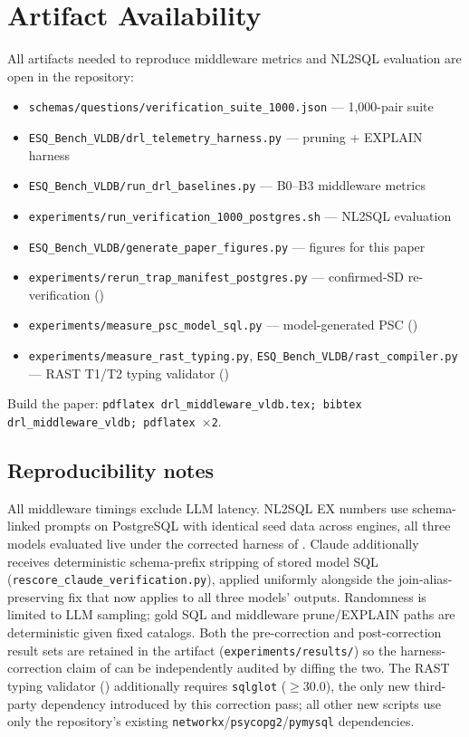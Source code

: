 \documentclass[twocolumn]{svjour3}
\begin{document}
\section{Artifact Availability}
\label{sec:artifact}

All artifacts needed to reproduce middleware metrics and NL2SQL evaluation are open in the repository:
\begin{itemize}[leftmargin=*]
  \item \texttt{schemas/questions/verification\_suite\_1000.json} --- 1{,}000-pair suite
  \item \texttt{ESQ\_Bench\_VLDB/drl\_telemetry\_harness.py} --- pruning + EXPLAIN harness
  \item \texttt{ESQ\_Bench\_VLDB/run\_drl\_baselines.py} --- B0--B3 middleware metrics
  \item \texttt{experiments/run\_verification\_1000\_postgres.sh} --- NL2SQL evaluation
  \item \texttt{ESQ\_Bench\_VLDB/generate\_paper\_figures.py} --- figures for this paper
  \item \texttt{experiments/rerun\_trap\_manifest\_postgres.py} --- confirmed-SD re-verification ()
  \item \texttt{experiments/measure\_psc\_model\_sql.py} --- model-generated PSC ()
  \item \texttt{experiments/measure\_rast\_typing.py}, \texttt{ESQ\_Bench\_VLDB/rast\_compiler.py} --- RAST T1/T2 typing validator ()
\end{itemize}
Build the paper: \texttt{pdflatex drl\_middleware\_vldb.tex; bibtex drl\_middleware\_vldb; pdflatex $\times$2}.

\subsection*{Reproducibility notes}
All middleware timings exclude LLM latency.
NL2SQL EX numbers use schema-linked prompts on PostgreSQL with identical seed data across engines, all three models evaluated live under the corrected harness of .
Claude additionally receives deterministic schema-prefix stripping of stored model SQL (\texttt{rescore\_claude\_verification.py}), applied uniformly alongside the join-alias-preserving fix that now applies to all three models' outputs.
Randomness is limited to LLM sampling; gold SQL and middleware prune/EXPLAIN paths are deterministic given fixed catalogs.
Both the pre-correction and post-correction result sets are retained in the artifact (\texttt{experiments/results/}) so the harness-correction claim of  can be independently audited by diffing the two.
The RAST typing validator () additionally requires \texttt{sqlglot} ($\ge$30.0), the only new third-party dependency introduced by this correction pass; all other new scripts use only the repository's existing \texttt{networkx}/\texttt{psycopg2}/\texttt{pymysql} dependencies.
\end{document}
